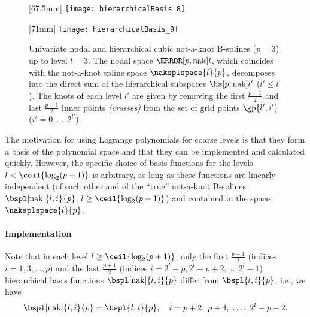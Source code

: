 \begin{figure}
  [67.5mm]{%
    \texttt{[image: hierarchicalBasis\_8]}%
  }%
  \hfill%
  \hfill%
  [71mm]{%
    \texttt{[image: hierarchicalBasis\_9]}%
  }%
  \caption[%
    Nodal and hierarchical not-a-knot B-splines%
  ]{%
    Univariate nodal and hierarchical cubic not-a-knot B-splines ($p = 3$)
    up to level $l = 3$.
    The nodal space $\nsbspl[\nak]{l}{p}$,
    which coincides with the not-a-knot spline space $\naksplspace{l}{p}$,
    decomposes into the direct sum
    of the hierarchical subspaces $\hsbspl[\nak]{l'}{p}$ ($l' \le l$).
    The knots of each level $l'$ are given by removing the
    first $\tfrac{p-1}{2}$ and last $\tfrac{p-1}{2}$
    inner points \emph{(crosses)}
    from the set of grid points $\gp{l',i'}$
    ($i' = 0, \dotsc, 2^{l'}$).%
  }%
  \label{fig:notAKnotBSpline}%
\end{figure}

\vspace*{\fill}

The motivation for using Lagrange polynomials for coarse levels
is that they form a basis of the polynomial space
and that they can be implemented and calculated quickly.
However, the specific choice of basis functions for the levels
$l < \ceil{\log_2(p + 1)}$ is arbitrary,
as long as these functions are linearly independent
(of each other and of the ``true'' not-a-knot B-splines
$\bspl[\nak]{l,i}{p}$, $l \ge \ceil{\log_2(p+1)}$)
and contained in the space $\naksplspace{l}{p}$.

\pagebreak

\paragraph{Implementation}

Note that in each level $l \ge \ceil{\log_2(p+1)}$,
only the first $\tfrac{p+1}{2}$
(indices $i = 1, 3, \dotsc, p$)
and the last $\tfrac{p+1}{2}$
(indices $i = 2^l - p, 2^l - p + 2, \dotsc, 2^l - 1$)
hierarchical basis functions $\bspl[\nak]{l,i}{p}$
differ from $\bspl{l,i}{p}$,
i.e., we have
\begin{equation}
  \bspl[\nak]{l,i}{p} = \bspl{l,i}{p},\quad
  i = p + 2,\; p + 4,\; \dotsc,\; 2^l - p - 2.
\end{equation}


